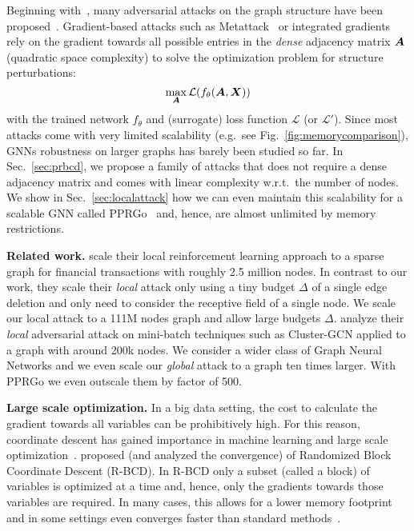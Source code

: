 \documentclass[sigconf, review]{acmart}
\newcommand{\adj}{\mA}
\newcommand{\features}{\mX}
\begin{document}
Beginning with~\citep{Dai2018, Zugner2018}, many adversarial attacks on the graph structure have been proposed~\citep{Zugner2019a, Xu2019a, Bojchevski2019, Wu2019, Wang2019, Tang2020}. Gradient-based attacks such as Metattack~\citep{Zugner2019a} or integrated gradients~\citep{Wu2019} rely on the gradient towards all possible entries in the \textit{dense} adjacency matrix \(\adj\) (quadratic space complexity) to solve the optimization problem for structure perturbations:
\begin{equation}\label{eq:attack}
  \max_{\adj} \mathcal{L}(f_{\theta}(\adj, \features))
\end{equation}
with the trained network \(f_{\theta}\) and (surrogate) loss function \(\mathcal{L}\) (or $\mathcal{L}'$).
Since most attacks come with very limited scalability (e.g.\ see Fig.~\ref{fig:memorycomparison}), GNNs robustness on larger graphs has barely been studied so far. In Sec.~\ref{sec:prbcd}, we propose a family of attacks that does not require a dense adjacency matrix and comes with linear complexity w.r.t.\ the number of nodes. We show in Sec.~\ref{sec:localattack} how we can even maintain this scalability for a scalable GNN called PPRGo~\citep{Bojchevski2020a} and, hence, are almost unlimited by memory restrictions.

\textbf{Related work.} \citet{Dai2018} scale their local reinforcement learning approach to a sparse graph for financial transactions with roughly 2.5 million nodes. In contrast to our work, they scale their \emph{local} attack only using a tiny budget \(\Delta\) of a single edge deletion and only need to consider the receptive field of a single node. We scale our local attack to a 111M nodes graph and allow large budgets \(\Delta\). \citet{Li2020a} analyze their \emph{local} adversarial attack on mini-batch techniques such as Cluster-GCN applied to a graph with around 200k nodes. We consider a wider class of Graph Neural Networks and we even scale our \emph{global} attack to a graph ten times larger. With PPRGo we even outscale them by factor of 500.

\textbf{Large scale optimization.} In a big data setting, the cost to calculate the gradient towards all variables can be prohibitively high. For this reason, coordinate descent has gained importance in machine learning and large scale optimization~\citep{Wright2015}. \citet{Nesterov2012} proposed (and analyzed the convergence) of Randomized Block Coordinate Descent (R-BCD). In R-BCD only a subset (called a block) of variables is optimized at a time and, hence, only the gradients towards those variables are required. In many cases, this allows for a lower memory footprint and in some settings even converges faster than standard methods~\citep{Nesterov2017}.
\end{document}
